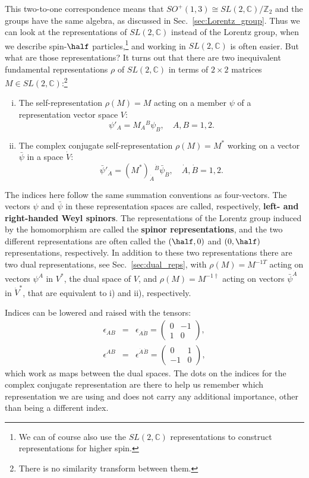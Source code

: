 \documentclass[notes.tex]{subfiles}
\begin{document}
This two-to-one correspondence means that $SO^+(1,3) \cong SL(2, \mathbb{C})/\mathbb{Z}_2$ and the groups have the same algebra, as discussed in Sec.~\ref{sec:Lorentz_group}. Thus we can look at the representations of $SL(2, \mathbb{C})$ instead of the  Lorentz group, when we describe spin-$\half$ particles,\footnote{We can of course also use the $SL(2, \mathbb{C})$ representations to construct representations for higher spin.} and working in $SL(2, \mathbb{C})$ is often easier. But what are those representations? It turns out that there are two inequivalent fundamental representations $\rho$ of $SL(2, \mathbb{C})$ in terms of $2\times2$ matrices $M\in SL(2, \mathbb{C})$:\footnote{There is no similarity transform between them.}
\begin{enumerate}[i)]
\item The self-representation $\rho(M) = M$  acting on a member $\psi$ of a representation vector space $V$:
\[\psi'_A = M_A{}^B\psi_B,  \quad A, B = 1,2.\]
\item The complex conjugate self-representation $\rho(M) = M^*$ working on a vector $\bar{\psi}$ in a space $\dot V$:
\[\bar{\psi}'_{\dot{A}} = (M^*)_{\dot{A}}{}^{\dot{B}}\bar{\psi}_{\dot{B}}, \quad  \dot{A}, \dot{B} = 1,2.\]
\end{enumerate}
The indices here follow the same summation conventions as four-vectors. 
The vectors $\psi$ and $\bar{\psi}$ in these representation spaces are called, respectively, {\bf left- and right-handed Weyl spinors}. The representations of the Lorentz group induced by the homomorphism are called the {\bf spinor representations}, and the two different  representations are often called the $(\half,0)$ and $(0,\half)$ representations, respectively.
In addition to these two representations there are two dual representations, see Sec.~\ref{sec:dual_reps}, with $\rho(M)=M^{-1T}$ acting on vectors $\psi^A$ in $V^*$, the dual space of $V$, and $\rho(M)=M^{-1\dagger}$ acting on vectors  $\bar\psi^{\dot{A}}$ in $\dot{V}^*$, that are equivalent to i) and ii), respectively. 

Indices can be lowered and raised with the tensors:
\begin{eqnarray}
\epsilon_{AB} &=& \epsilon_{\dot A \dot B} = \begin{pmatrix} 0 & -1\\ 1 & 0\end{pmatrix}, \label{eq:epsilonAB} \\
\epsilon^{AB} &=& \epsilon^{\dot{A}}{}^{\dot{B}} = \begin{pmatrix} 0 & 1\\ -1 & 0\end{pmatrix},\label{eq:epsilonAdotBdot}
\end{eqnarray}
which work as maps between the dual spaces.
The dots on the indices for the complex conjugate representation are there to help us remember which representation we are using and does not carry any additional importance, other than being a different index. 
\end{document}

